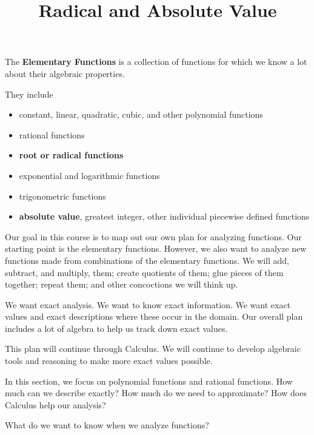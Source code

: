 \documentclass{ximera}
\title{Radical and Absolute Value}
\begin{document}
\begin{abstract}
\end{abstract}
\maketitle




The \textbf{Elementary Functions} is a collection of functions for which we know a lot about their algebraic properties.

They include 

\begin{itemize}
\item constant, linear, quadratic, cubic, and other polynomial functions
\item rational functions
\item \textbf{\textcolor{purple!85!blue}{root or radical functions}} 
\item exponential and logarithmic functions
\item trigonometric functions
\item \textbf{\textcolor{purple!85!blue}{absolute value}}, greatest integer, other individual piecewise defined functions
\end{itemize}








Our goal in this course is to map out our own plan for analyzing functions.  Our starting point is the elementary functions. However, we also want to analyze new functions made from combinations of the elementary functions.  We will add, subtract, and multiply, them; create quotients of them; glue pieces of them together; repeat them; and other concoctions we will think up.

We want exact analysis.  We want to know exact information.  We want exact values and exact descriptions where these occur in the domain. Our overall plan includes a lot of algebra to help us track down exact values.  


This plan will continue through Calculus.  We will continue to develop algebraic tools and reasoning to make more exact values possible.

In this section, we focus on polynomial functions and rational functions.  How much can we describe exactly? How much do we need to approximate? How does Calculus help our analysis?


What do we want to know when we analyze functions?
\end{document}
